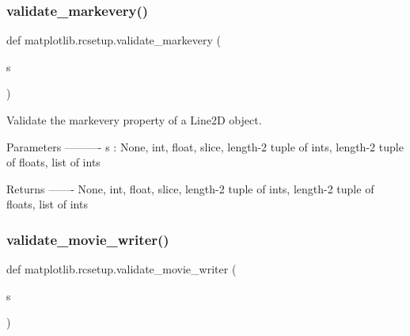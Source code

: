 \mbox{\label{namespacematplotlib_1_1rcsetup_a8f90881deb0225046250e25b6250bf52}} 
\subsubsection{\texorpdfstring{validate\+\_\+markevery()}{validate\_markevery()}}
{\footnotesize\ttfamily def matplotlib.\+rcsetup.\+validate\+\_\+markevery (\begin{DoxyParamCaption}\item[{}]{s }\end{DoxyParamCaption})}

\begin{DoxyVerb}Validate the markevery property of a Line2D object.

Parameters
----------
s : None, int, float, slice, length-2 tuple of ints,
    length-2 tuple of floats, list of ints

Returns
-------
None, int, float, slice, length-2 tuple of ints,
    length-2 tuple of floats, list of ints\end{DoxyVerb}
 \mbox{\label{namespacematplotlib_1_1rcsetup_a0c30d4d749e33a72b77fa26f69b7aa8f}} 
\subsubsection{\texorpdfstring{validate\+\_\+movie\+\_\+writer()}{validate\_movie\_writer()}}
{\footnotesize\ttfamily def matplotlib.\+rcsetup.\+validate\+\_\+movie\+\_\+writer (\begin{DoxyParamCaption}\item[{}]{s }\end{DoxyParamCaption})}

\mbox{\label{namespacematplotlib_1_1rcsetup_a0f4e77e2ceb4ce318b11f4ece24cb6e7}} 
